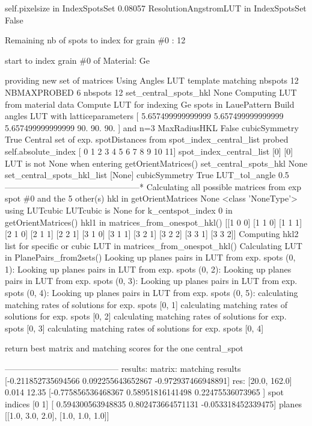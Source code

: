 \documentclass[letterpaper,10pt,english]{sphinxmanual}
\begin{document}
\begin{sphinxalltt}
self.pixelsize in IndexSpotsSet 0.08057
ResolutionAngstromLUT in IndexSpotsSet False

 Remaining nb of spots to index for grain \#0 : 12


 \sphinxstylestrong{**}
start to index grain \#0 of Material: Ge

\sphinxstylestrong{**}

providing new set of matrices Using Angles LUT template matching
nbspots 12
NBMAXPROBED 6
nbspots 12
set\_central\_spots\_hkl None
Computing LUT from material data
Compute LUT for indexing Ge spots in LauePattern
Build angles LUT with latticeparameters
{[} 5.657499999999999  5.657499999999999  5.657499999999999
 90.                90.                90.               {]}
and n=3
MaxRadiusHKL False
cubicSymmetry True
Central set of exp. spotDistances from spot\_index\_central\_list probed
self.absolute\_index {[} 0  1  2  3  4  5  6  7  8  9 10 11{]}
spot\_index\_central\_list {[}0{]}
{[}0{]}
LUT is not None when entering getOrientMatrices()
set\_central\_spots\_hkl None
set\_central\_spots\_hkl\_list {[}None{]}
cubicSymmetry True
LUT\_tol\_angle 0.5
\sphinxstyleemphasis{---***}------------------------------------------------*
Calculating all possible matrices from exp spot \#0 and the 5 other(s)
hkl in getOrientMatrices None \textless{}class 'NoneType'\textgreater{}
using LUTcubic
LUTcubic is None for k\_centspot\_index 0 in getOrientMatrices()
hkl1 in matrices\_from\_onespot\_hkl() {[}{[}1 0 0{]}
 {[}1 1 0{]}
 {[}1 1 1{]}
 {[}2 1 0{]}
 {[}2 1 1{]}
 {[}2 2 1{]}
 {[}3 1 0{]}
 {[}3 1 1{]}
 {[}3 2 1{]}
 {[}3 2 2{]}
 {[}3 3 1{]}
 {[}3 3 2{]}{]}
Computing hkl2 list for specific or cubic LUT in matrices\_from\_onespot\_hkl()
Calculating LUT in PlanePairs\_from2sets()
Looking up planes pairs in LUT from exp. spots (0, 1):
Looking up planes pairs in LUT from exp. spots (0, 2):
Looking up planes pairs in LUT from exp. spots (0, 3):
Looking up planes pairs in LUT from exp. spots (0, 4):
Looking up planes pairs in LUT from exp. spots (0, 5):
calculating matching rates of solutions for exp. spots {[}0, 1{]}
calculating matching rates of solutions for exp. spots {[}0, 2{]}
calculating matching rates of solutions for exp. spots {[}0, 3{]}
calculating matching rates of solutions for exp. spots {[}0, 4{]}


return best matrix and matching scores for the one central\_spot

-----------------------------------------
results:
matrix:                                         matching results
{[}-0.211852735694566  0.092255643652867 -0.972937466948891{]}        res: {[}20.0, 162.0{]} 0.014 12.35
{[}-0.775856536468367  0.58951816141498   0.22475536073965 {]}        spot indices {[}0 1{]}
{[} 0.594300563948835  0.802473664571131 -0.053318452339475{]}        planes {[}{[}1.0, 3.0, 2.0{]}, {[}1.0, 1.0, 1.0{]}{]}


\end{sphinxalltt}
\end{document}
